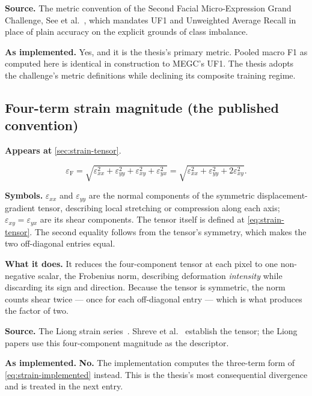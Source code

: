 \textbf{Source.} The metric convention of the Second Facial Micro-Expression
Grand Challenge, See et al.~\cite{see2019}, which mandates UF1 and Unweighted
Average Recall in place of plain accuracy on the explicit grounds of class
imbalance.

\textbf{As implemented.} Yes, and it is the thesis's primary metric. Pooled
macro F1 as computed here is identical in construction to MEGC's UF1. The
thesis adopts the challenge's metric definitions while declining its composite
training regime.

\subsection{Four-term strain magnitude (the published convention)}
\label{eq:strain-frobenius}

\textbf{Appears at} \autoref{sec:strain-tensor}.

\[
    \varepsilon_{\mathrm{F}}
    =\sqrt{\varepsilon_{xx}^{2}+\varepsilon_{yy}^{2}
        +\varepsilon_{xy}^{2}+\varepsilon_{yx}^{2}}
    =\sqrt{\varepsilon_{xx}^{2}+\varepsilon_{yy}^{2}
        +2\varepsilon_{xy}^{2}}.
\]

\textbf{Symbols.} $\varepsilon_{xx}$ and $\varepsilon_{yy}$ are the normal
components of the symmetric displacement-gradient tensor, describing local
stretching or compression along each axis; $\varepsilon_{xy}=\varepsilon_{yx}$
are its shear components. The tensor itself is defined at
\autoref{eq:strain-tensor}. The second equality follows from the tensor's
symmetry, which makes the two off-diagonal entries equal.

\textbf{What it does.} It reduces the four-component tensor at each pixel to
one non-negative scalar, the Frobenius norm, describing deformation
\emph{intensity} while discarding its sign and direction. Because the tensor is
symmetric, the norm counts shear twice --- once for each off-diagonal entry ---
which is what produces the factor of two.

\textbf{Source.} The Liong strain series~\cite{liong2014a,liong2014b,liong2016}.
Shreve et al.~\cite{shreve2011} establish the tensor; the Liong papers use this
four-component magnitude as the descriptor.

\textbf{As implemented.} \textbf{No.} The implementation computes the
three-term form of \autoref{eq:strain-implemented} instead. This is the
thesis's most consequential divergence and is treated in the next entry.

